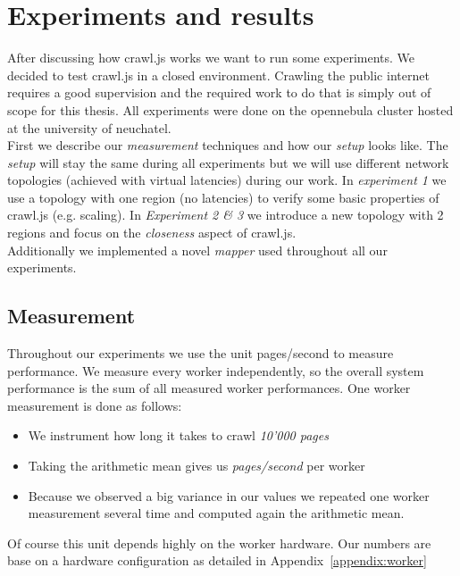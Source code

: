 
\chapter{Experiments and results} %

\label{Chapter5} %


After discussing how crawl.js works we want to run some experiments. We decided to test crawl.js in a closed environment. Crawling the public internet requires a good supervision and the required work to do that is simply out of scope for this thesis. All experiments were done on the opennebula cluster hosted at the university of neuchatel.
\\
First we describe our \emph{measurement} techniques and how our \emph{setup} looks like. The \emph{setup} will stay the same during all experiments but we will use different network topologies (achieved with virtual latencies) during our work. In \emph{experiment 1} we use a topology with one region (no latencies) to verify some basic properties of crawl.js (e.g. scaling). In \emph{Experiment 2 \& 3} we introduce a new topology with 2 regions and focus on the \emph{closeness} aspect of crawl.js.
\\
Additionally we implemented a novel \emph{mapper} used throughout all our experiments.

\section{Measurement}
Throughout our experiments we use the unit pages/second to measure performance. We measure every worker independently, so the overall system performance is the sum of all measured worker performances. One worker measurement is done as follows:
\begin{itemize}
  \item We instrument how long it takes to crawl \emph{10'000 pages}
  \item Taking the arithmetic mean gives us \emph{pages/second} per worker
  \item Because we observed a big variance in our values we repeated one worker measurement several time and computed again the arithmetic mean.
\end{itemize}
Of course this unit depends highly on the worker hardware. Our numbers are base on a hardware configuration as detailed in Appendix~\ref{appendix:worker}

